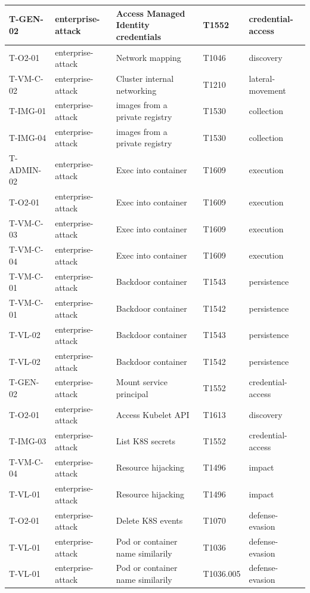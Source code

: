 \begin{longtable}{|l|l|l|l|l|}
    T-GEN-02 & enterprise-attack & Access Managed Identity credentials & T1552 & credential-access \\ \hline
    T-O2-01 & enterprise-attack & Network mapping & T1046 & discovery \\ \hline
    T-VM-C-02 & enterprise-attack & Cluster internal networking & T1210 & lateral-movement \\ \hline
    T-IMG-01 & enterprise-attack & images from a private registry & T1530 & collection \\ \hline
    T-IMG-04 & enterprise-attack & images from a private registry & T1530 & collection \\ \hline
    T-ADMIN-02 & enterprise-attack & Exec into container & T1609 & execution \\ \hline
    T-O2-01 & enterprise-attack & Exec into container & T1609 & execution \\ \hline
    T-VM-C-03 & enterprise-attack & Exec into container & T1609 & execution \\ \hline
    T-VM-C-04 & enterprise-attack & Exec into container & T1609 & execution \\ \hline
    T-VM-C-01 & enterprise-attack & Backdoor container & T1543 & persistence \\ \hline
    T-VM-C-01 & enterprise-attack & Backdoor container & T1542 & persistence \\ \hline
    T-VL-02 & enterprise-attack & Backdoor container & T1543 & persistence \\ \hline
    T-VL-02 & enterprise-attack & Backdoor container & T1542 & persistence \\ \hline
    T-GEN-02 & enterprise-attack & Mount service principal & T1552 & credential-access \\ \hline
    T-O2-01 & enterprise-attack & Access Kubelet API & T1613 & discovery \\ \hline
    T-IMG-03 & enterprise-attack & List K8S secrets & T1552 & credential-access \\ \hline
    T-VM-C-04 & enterprise-attack & Resource hijacking & T1496 & impact \\ \hline
    T-VL-01 & enterprise-attack & Resource hijacking & T1496 & impact \\ \hline
    T-O2-01 & enterprise-attack & Delete K8S events & T1070 & defense-evasion \\ \hline
    T-VL-01 & enterprise-attack & Pod or container name similarily & T1036 & defense-evasion \\ \hline
    T-VL-01 & enterprise-attack & Pod or container name similarily & T1036.005 & defense-evasion \\ \hline

\end{longtable}
